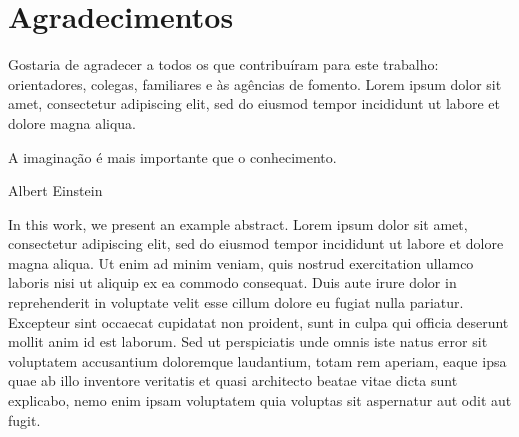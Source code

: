 \documentclass[dsc,setavermelha,numeracaoporcapitulo,linhanafolhaderosto]{ufrj}
\theoremstyle{plain}
\theoremstyle{definition}
\theoremstyle{remark}
\begin{document}
  \frontmatter
  \dedication{A alguém cujo valor é digno desta dedicatória.}

  \chapter*{Agradecimentos}

  Gostaria de agradecer a todos os que contribuíram para este trabalho:
  orientadores, colegas, familiares e às agências de fomento. Lorem ipsum
  dolor sit amet, consectetur adipiscing elit, sed do eiusmod tempor incididunt
  ut labore et dolore magna aliqua.

  \epigraph{A imaginação é mais importante que o conhecimento.}{Albert Einstein}

  \begin{abstract}%

  Apresenta-se, nesta tese, um exemplo de resumo. Lorem ipsum dolor sit amet,
  consectetur adipiscing elit, sed do eiusmod tempor incididunt ut labore et
  dolore magna aliqua. Ut enim ad minim veniam, quis nostrud exercitation
  ullamco laboris nisi ut aliquip ex ea commodo consequat. Duis aute irure dolor
  in reprehenderit in voluptate velit esse cillum dolore eu fugiat nulla
  pariatur. Excepteur sint occaecat cupidatat non proident, sunt in culpa qui
  officia deserunt mollit anim id est laborum. Sed ut perspiciatis unde omnis
  iste natus error sit voluptatem accusantium doloremque laudantium, totam rem
  aperiam, eaque ipsa quae ab illo inventore veritatis et quasi architecto beatae
  vitae dicta sunt explicabo, nemo enim ipsam voluptatem quia voluptas sit
  aspernatur aut odit aut fugit.

  \end{abstract}

  \begin{foreignabstract}

  In this work, we present an example abstract. Lorem ipsum dolor sit amet,
  consectetur adipiscing elit, sed do eiusmod tempor incididunt ut labore et
  dolore magna aliqua. Ut enim ad minim veniam, quis nostrud exercitation
  ullamco laboris nisi ut aliquip ex ea commodo consequat. Duis aute irure dolor
  in reprehenderit in voluptate velit esse cillum dolore eu fugiat nulla
  pariatur. Excepteur sint occaecat cupidatat non proident, sunt in culpa qui
  officia deserunt mollit anim id est laborum. Sed ut perspiciatis unde omnis
  iste natus error sit voluptatem accusantium doloremque laudantium, totam rem
  aperiam, eaque ipsa quae ab illo inventore veritatis et quasi architecto beatae
  vitae dicta sunt explicabo, nemo enim ipsam voluptatem quia voluptas sit
  aspernatur aut odit aut fugit.

  \end{foreignabstract}
\end{document}
